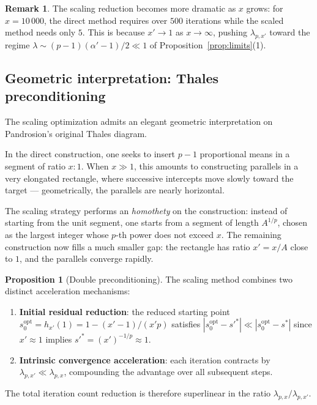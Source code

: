 \documentclass[11pt,a4paper]{article}
\theoremstyle{definition}
\newtheorem{proposition}{Proposition}[section]
\newtheorem{remark}{Remark}[section]
\begin{document}
\begin{remark}
The scaling reduction becomes more dramatic as $x$ grows: for $x = 10\,000$, the direct method requires over $500$ iterations while the scaled method needs only $5$. This is because $x' \to 1$ as $x \to \infty$, pushing $\lambda_{p,x'}$ toward the regime $\lambda \sim (p-1)(\alpha'-1)/2 \ll 1$ of Proposition~\ref{prop:limits}(1).
\end{remark}

\subsection{Geometric interpretation: Thales preconditioning}
\label{subsec:thales_preconditioning}

The scaling optimization admits an elegant geometric interpretation on Pandrosion's original Thales diagram.

\medskip

In the direct construction, one seeks to insert $p-1$ proportional means in a segment of ratio $x : 1$. When $x \gg 1$, this amounts to constructing parallels in a very elongated rectangle, where successive intercepts move slowly toward the target --- geometrically, the parallels are nearly horizontal.

\smallskip

The scaling strategy performs an \emph{homothety} on the construction: instead of starting from the unit segment, one starts from a segment of length $A^{1/p}$, chosen as the largest integer whose $p$-th power does not exceed $x$. The remaining construction now fills a much smaller gap: the rectangle has ratio $x' = x/A$ close to $1$, and the parallels converge rapidly.

\begin{proposition}[Double preconditioning]
\label{prop:preconditioning}
The scaling method combines two distinct acceleration mechanisms:
\begin{enumerate}
  \item \textbf{Initial residual reduction}: the reduced starting point $s_0^{\mathrm{opt}} = h_{x'}(1) = 1 - (x'-1)/(x'p)$ satisfies $|s_0^{\mathrm{opt}} - s'^*| \ll |s_0^{\mathrm{opt}} - s^*|$ since $x' \approx 1$ implies $s'^* = (x')^{-1/p} \approx 1$.
  \item \textbf{Intrinsic convergence acceleration}: each iteration contracts by $\lambda_{p,x'} \ll \lambda_{p,x}$, compounding the advantage over all subsequent steps.
\end{enumerate}
The total iteration count reduction is therefore superlinear in the ratio $\lambda_{p,x}/\lambda_{p,x'}$.
\end{proposition}
\end{document}
